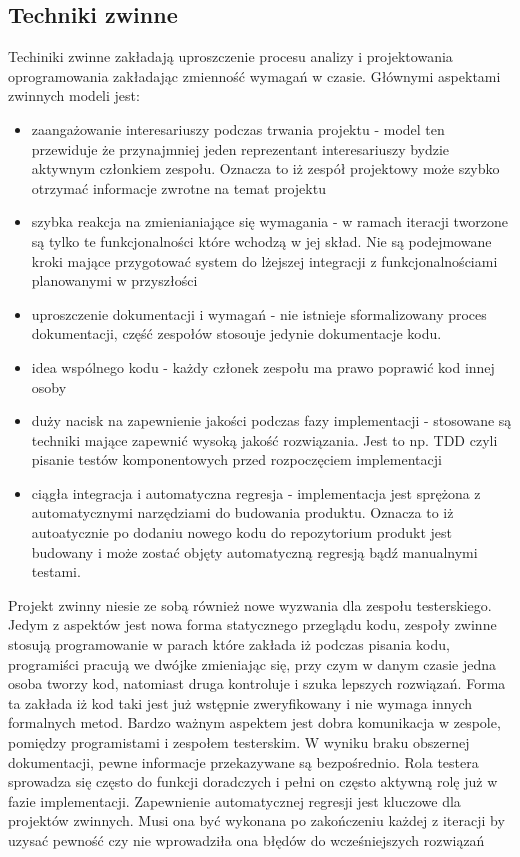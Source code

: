 \subsection{Techniki zwinne}
Techiniki zwinne zakładają uproszczenie procesu analizy i projektowania oprogramowania zakładając zmienność wymagań w czasie. Głównymi aspektami zwinnych modeli jest:
\begin{itemize}
  \item zaangażowanie interesariuszy podczas trwania projektu - model ten przewiduje że przynajmniej jeden reprezentant interesariuszy bydzie aktywnym członkiem zespołu. Oznacza to iż zespół projektowy może szybko otrzymać informacje zwrotne na temat projektu
  \item szybka reakcja na zmienianiające się wymagania - w ramach iteracji tworzone są tylko te funkcjonalności które wchodzą w jej skład. Nie są podejmowane kroki mające przygotować system do lżejszej integracji z funkcjonalnościami planowanymi w przyszłości 
  \item uproszczenie dokumentacji i wymagań - nie istnieje sformalizowany proces dokumentacji, część zespołów stosouje jedynie dokumentacje kodu.
  \item idea wspólnego kodu - każdy członek zespołu ma prawo poprawić kod innej osoby
  \item duży nacisk na zapewnienie jakości podczas fazy implementacji - stosowane są techniki mające zapewnić wysoką jakość rozwiązania. Jest to np. TDD czyli pisanie testów komponentowych przed rozpoczęciem implementacji
  \item ciągła integracja i automatyczna regresja - implementacja jest sprężona z automatycznymi narzędziami do budowania produktu. Oznacza to iż autoatycznie po dodaniu nowego kodu do repozytorium produkt jest budowany i może zostać objęty automatyczną regresją bądź manualnymi testami.
\end{itemize}
Projekt zwinny niesie ze sobą również nowe wyzwania dla zespołu testerskiego. Jedym z aspektów jest nowa forma statycznego przeglądu kodu, zespoły zwinne stosują programowanie w parach które zakłada iż podczas pisania kodu, programiści pracują we dwójke zmieniając się, przy czym w danym czasie jedna osoba tworzy kod, natomiast druga kontroluje i szuka lepszych rozwiązań. Forma ta zakłada iż kod taki jest już wstępnie zweryfikowany i nie wymaga innych formalnych metod. 
Bardzo ważnym aspektem jest dobra komunikacja w zespole, pomiędzy programistami i zespołem testerskim. W wyniku braku obszernej dokumentacji, pewne informacje przekazywane są bezpośrednio. Rola testera sprowadza się często do funkcji doradczych i pełni on często aktywną rolę już w fazie implementacji.
Zapewnienie automatycznej regresji jest kluczowe dla projektów zwinnych. Musi ona być wykonana po zakończeniu każdej z iteracji by uzysać pewność czy nie wprowadziła ona błędów do wcześniejszych rozwiązań

